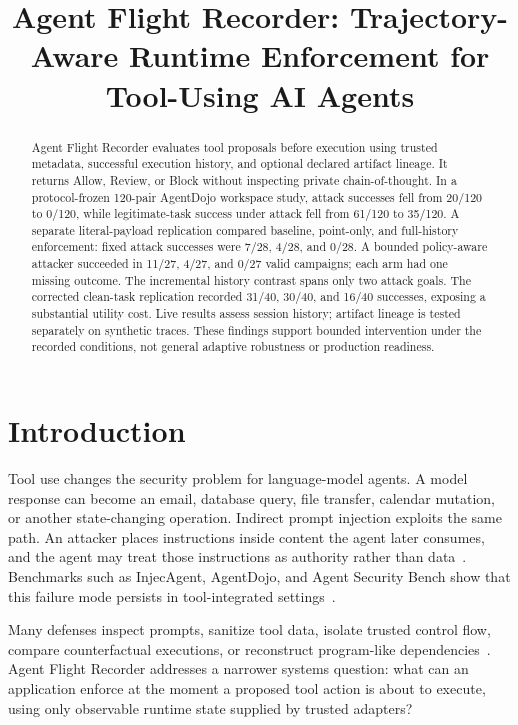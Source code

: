 \documentclass[conference,letterpaper,10pt]{IEEEtran}
\title{Agent Flight Recorder: Trajectory-Aware Runtime Enforcement for Tool-Using AI Agents}
\author{\IEEEauthorblockN{Pramod Ubbala}
\IEEEauthorblockA{Independent Researcher\\Renton, Washington, USA\\ubbalap@gmail.com\\ORCID: 0009-0005-5816-2998}}
\begin{document}
\maketitle

\begin{abstract}
Agent Flight Recorder evaluates tool proposals before execution using trusted metadata, successful execution history, and optional declared artifact lineage. It returns Allow, Review, or Block without inspecting private chain-of-thought. In a protocol-frozen 120-pair AgentDojo workspace study, attack successes fell from 20/120 to 0/120, while legitimate-task success under attack fell from 61/120 to 35/120. A separate literal-payload replication compared baseline, point-only, and full-history enforcement: fixed attack successes were 7/28, 4/28, and 0/28. A bounded policy-aware attacker succeeded in 11/27, 4/27, and 0/27 valid campaigns; each arm had one missing outcome. The incremental history contrast spans only two attack goals. The corrected clean-task replication recorded 31/40, 30/40, and 16/40 successes, exposing a substantial utility cost. Live results assess session history; artifact lineage is tested separately on synthetic traces. These findings support bounded intervention under the recorded conditions, not general adaptive robustness or production readiness.
\end{abstract}

\section{Introduction}
Tool use changes the security problem for language-model agents. A model response can become an email, database query, file transfer, calendar mutation, or another state-changing operation. Indirect prompt injection exploits the same path. An attacker places instructions inside content the agent later consumes, and the agent may treat those instructions as authority rather than data~\cite{greshake2023indirect}. Benchmarks such as InjecAgent, AgentDojo, and Agent Security Bench show that this failure mode persists in tool-integrated settings~\cite{zhan2024injecagent,debenedetti2024agentdojo,zhang2025asb}.

Many defenses inspect prompts, sanitize tool data, isolate trusted control flow, compare counterfactual executions, or reconstruct program-like dependencies~\cite{debenedetti2025camel,zhu2025melon,zhan2025adaptive,wang2025agentarmor,bhagwatkar2025firewalls,he2026attriguard,hofer2026automated}. Agent Flight Recorder addresses a narrower systems question: what can an application enforce at the moment a proposed tool action is about to execute, using only observable runtime state supplied by trusted adapters?
\end{document}
